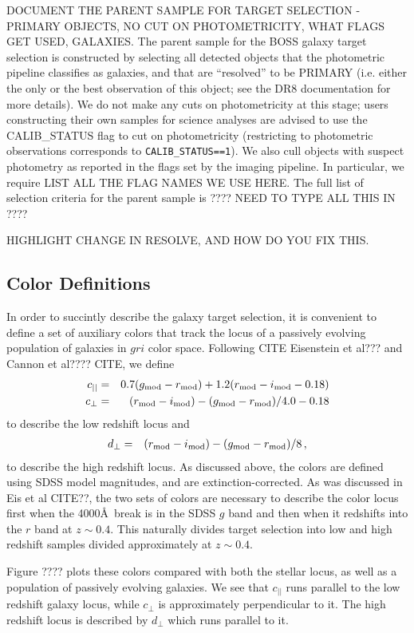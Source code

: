 \documentclass[preprint]{aastex}
\newcommand{\cpp}{c_{\perp}}
\newcommand{\cll}{c_{||}}
\newcommand{\dpp}{d_{\perp}}
\newcommand{\gmod}{g_{\rm mod}}
\newcommand{\rmod}{r_{\rm mod}}
\newcommand{\imod}{i_{\rm mod}}
\begin{document}
DOCUMENT THE PARENT SAMPLE FOR TARGET SELECTION - PRIMARY OBJECTS, NO CUT ON 
PHOTOMETRICITY, WHAT FLAGS GET USED, GALAXIES.
The parent sample for the BOSS galaxy target selection is constructed by
selecting all detected objects that the photometric pipeline classifies as
galaxies, and that are ``resolved'' to be PRIMARY (i.e. either the only or the
best observation of this object; see the DR8 documentation for more details). We
do not make any cuts on photometricity at this stage; users constructing their
own samples for science analyses are advised to use the CALIB\_STATUS flag to
cut on photometricity (restricting to photometric observations corresponds to
\texttt{CALIB\_STATUS==1}). We also cull objects with suspect photometry as
reported in the flags set by the imaging pipeline. In particular, we require 
LIST ALL THE FLAG NAMES WE USE HERE. The full list of selection criteria for the
parent sample is ???? NEED TO TYPE ALL THIS IN ????

HIGHLIGHT CHANGE IN RESOLVE, AND HOW DO YOU FIX THIS. 

\subsection{Color Definitions}

In order to succintly describe the galaxy target selection, it is convenient to
define a set of auxiliary colors that track the locus of a passively evolving
population of galaxies in $gri$ color space. Following CITE Eisenstein et al???
and Cannon et al???? CITE, we define 
\begin{eqnarray}
\cll & = &  0.7 (\gmod - \rmod) + 1.2(\rmod - \imod - 0.18)  \\
\cpp & = & (\rmod - \imod) - (\gmod - \rmod)/4.0 - 0.18 
\end{eqnarray}
to describe the low redshift locus and 
\begin{eqnarray}
\dpp & = & (\rmod - \imod) - (\gmod - \rmod)/8 \,,
\end{eqnarray}
to describe the high redshift locus. As discussed above, the colors are defined
using SDSS model magnitudes, and are extinction-corrected. As was discussed in
Eis et al CITE??, the two sets of colors are necessary to describe the color
locus first when the 4000\AA\ break is in the SDSS $g$ band and then when it
redshifts into the $r$ band at $z\sim0.4$. This naturally divides target
selection into low and high redshift samples divided approximately at
$z\sim0.4$. 

Figure ???? plots these colors compared with both the stellar locus,
as well as a population of passively evolving galaxies. We see that $\cll$ runs
parallel to the low redshift galaxy locus, while $\cpp$ is approximately
perpendicular to it. The high redshift locus is described by $\dpp$ which runs
parallel to it. 
\end{document}
